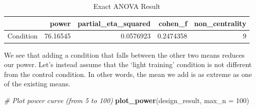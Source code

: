 \documentclass[]{book}
\newenvironment{Shaded}{\begin{snugshade}}{\end{snugshade}}
\newcommand{\CommentTok}[1]{\textcolor[rgb]{0.56,0.35,0.01}{\textit{#1}}}
\newcommand{\DataTypeTok}[1]{\textcolor[rgb]{0.13,0.29,0.53}{#1}}
\newcommand{\DecValTok}[1]{\textcolor[rgb]{0.00,0.00,0.81}{#1}}
\newcommand{\KeywordTok}[1]{\textcolor[rgb]{0.13,0.29,0.53}{\textbf{#1}}}
\newcommand{\NormalTok}[1]{#1}
\newcommand{\OperatorTok}[1]{\textcolor[rgb]{0.81,0.36,0.00}{\textbf{#1}}}
\newcommand{\StringTok}[1]{\textcolor[rgb]{0.31,0.60,0.02}{#1}}
\begin{document}
\begin{table}[!h]

\caption{\label{tab:unnamed-chunk-280}Exact ANOVA Result}
\centering
\begin{tabular}{l|r|r|r|r}
\hline
  & power & partial\_eta\_squared & cohen\_f & non\_centrality\\
\hline
Condition & 76.16545 & 0.0576923 & 0.2474358 & 9\\
\hline
\end{tabular}
\end{table}

We see that adding a condition that falls between the other two means reduces our power. Let's instead assume that the `light training' condition is not different from the control condition. In other words, the mean we add is as extreme as one of the existing means.

\begin{Shaded}
\begin{Highlighting}[]
\CommentTok{# Plot power curve (from 5 to 100)}
\KeywordTok{plot_power}\NormalTok{(design_result, }\DataTypeTok{max_n =} \DecValTok{100}\NormalTok{)}
\end{Highlighting}
\end{Shaded}

\begin{Shaded}
\end{Shaded}
\end{document}
